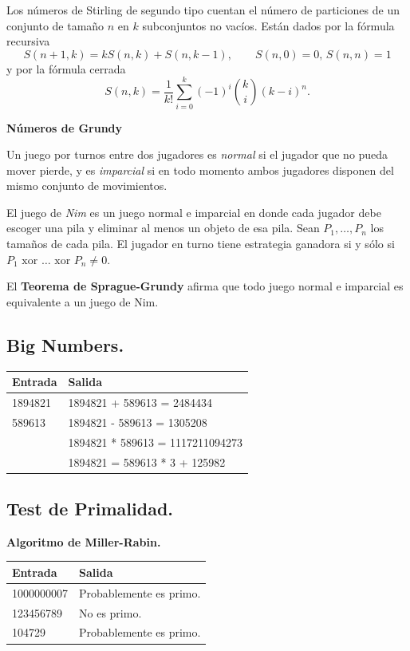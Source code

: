 \documentclass[12pt, letterpaper, twoside]{article}
\begin{document}
Los números de Stirling de segundo tipo cuentan el número de particiones de un conjunto de tamaño $n$ en $k$ subconjuntos no vacíos. Están dados por la fórmula recursiva
$$S(n + 1, k) = kS(n, k) + S(n, k - 1), \qquad S(n, 0) =  0, \, S(n, n) = 1$$
y por la fórmula cerrada
$$S(n, k) = \frac{1}{k!} \sum_{i=0}^k (-1)^i \binom{k}{i}(k - i)^n.$$

\textbf{Números de Grundy}

Un juego por turnos entre dos jugadores es \textit{normal} si el jugador que no pueda mover pierde, y es \textit{imparcial} si en todo momento ambos jugadores disponen del mismo conjunto de movimientos.

El juego de \textit{Nim} es un juego normal e imparcial en donde cada jugador debe escoger una pila y eliminar al menos un objeto de esa pila. Sean $P_1, \ldots, P_n$ los tamaños de cada pila. El jugador en turno tiene estrategia ganadora si y sólo si $P_1 \text{ xor } \ldots \text{ xor } P_n \neq 0$.

El \textbf{Teorema de Sprague-Grundy} afirma que todo juego normal e imparcial es equivalente a un juego de Nim.

\subsection{Big Numbers.}



\begin{tabular}{|p{7cm}|p{7cm}|}
\hline
\textbf{Entrada} & \textbf{Salida}\\ \hline
1894821 & 1894821 + 589613 = 2484434\\
589613  & 1894821 - 589613 = 1305208\\ 
& 1894821 * 589613 = 1117211094273\\ 
& 1894821 = 589613 * 3 + 125982\\ \hline
\end{tabular}\bigskip

\subsection{Test de Primalidad.}

\textbf{Algoritmo de Miller-Rabin.}

 

\begin{tabular}{|p{7cm}|p{7cm}|}
\hline
\textbf{Entrada} & \textbf{Salida}\\ \hline
1000000007 & Probablemente es primo.\\
123456789  & No es primo.\\
104729     & Probablemente es primo.\\ \hline
\end{tabular}\bigskip
\end{document}
